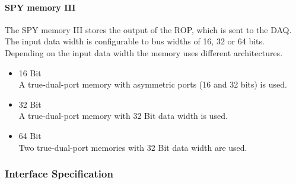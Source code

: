 \paragraph{SPY memory III}
The SPY memory III stores the output of the ROP, which is sent to the DAQ. The input data width is configurable to bus widths of 16, 32 or 64 bits.
Depending on the input data width the memory uses different architectures.
\begin{itemize}
\item 16 Bit \\
A true-dual-port memory with asymmetric ports (16 and 32 bits) is used.
\item 32 Bit \\
A true-dual-port memory with 32 Bit data width is used.
\item 64 Bit \\
Two true-dual-port memories with 32 Bit data width are used.
\end{itemize}

%
\subsubsection{Interface Specification}

\begin{minipage}{\textwidth}

\end{minipage}

